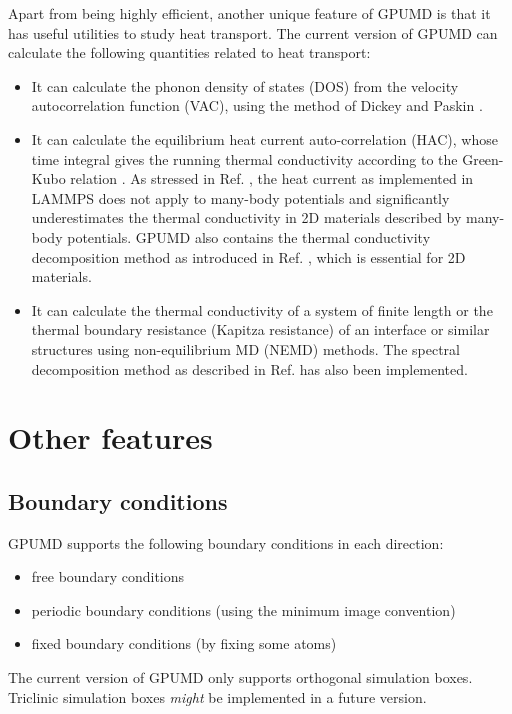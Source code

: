 \documentclass[12pt,a4paper]{report}
\begin{document}
Apart from being highly efficient, another unique feature of GPUMD is that it has useful utilities to study heat transport. The current version of GPUMD can calculate the following quantities related to heat transport:
\begin{itemize}
\item It can calculate the phonon density of states (DOS) from the velocity autocorrelation function (VAC), using the method of Dickey and Paskin \cite{dickey1969pr}.
\item It can calculate the equilibrium heat current auto-correlation (HAC), whose time integral gives the running thermal conductivity according to the Green-Kubo relation \cite{green1954jcp,kubo1957jpsj}. As stressed in Ref. \cite{fan2015prb}, the heat current as implemented in LAMMPS \cite{plimpton1995jcp} does not apply to many-body potentials and significantly underestimates the thermal conductivity in 2D materials described by many-body potentials. GPUMD also contains the thermal conductivity decomposition method as introduced in Ref. \cite{fan2017prb}, which is essential for 2D materials.
\item It can calculate the thermal conductivity of a system of finite length or the thermal boundary resistance (Kapitza resistance) of an interface or similar structures using non-equilibrium MD (NEMD) methods. The spectral decomposition method as described in Ref. \cite{fan2017prb} has also been implemented.
\end{itemize}



\section{Other features}

\subsection{Boundary conditions}

GPUMD supports the following boundary conditions in each direction:
  \begin{itemize}
  \item free boundary conditions
  \item periodic boundary conditions (using the minimum image convention)
  \item fixed boundary conditions (by fixing some atoms)
  \end{itemize}

The current version of GPUMD only supports orthogonal simulation boxes. Triclinic simulation boxes \textit{might} be implemented in a future version.
\end{document}
